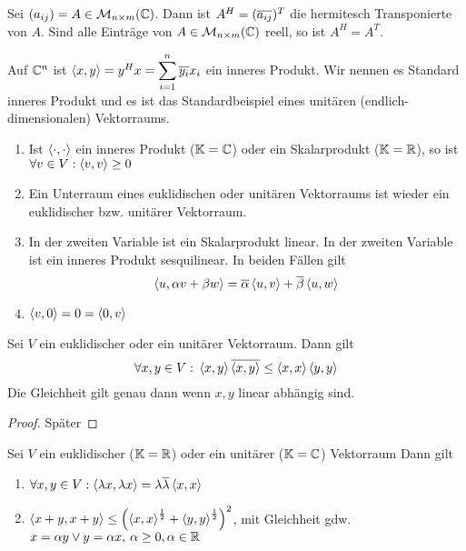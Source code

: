 \begin{definition}
    Sei $(a_{ij}) = A\in \mathcal{M}_{n\times m}(\mathbb{C})$. Dann ist $A^H = (\overline{
        a_{ij}})^T$ die hermitesch Transponierte von $A$. Sind alle Einträge von
        $A \in \mathcal{M}_{n\times m}(\mathbb{C})$ reell, so ist $A^H = A^T$.
\end{definition}
\begin{example}
    Auf $\mathbb{C}^n$ ist $\left<x,y\right>= y^H x= \displaystyle\sum_{i=1}^n \overline{y_i}x_i$ ein 
    inneres Produkt. Wir nennen es Standard inneres Produkt und es ist das 
    Standardbeispiel eines unitären (endlich-dimensionalen) Vektorraums.
\end{example}
\begin{remark}
    \hfill
    \begin{enumerate}
        \item Ist $\left<\cdot,\cdot\right>$ ein inneres Produkt ($\mathbb{K} = \mathbb{C}$) oder ein 
        Skalarprodukt ($\mathbb{K} = \mathbb{R}$), so ist $\forall v \in V: \left<v,v\right> \geq 0$ 
        \item Ein Unterraum eines euklidischen oder unitären Vektorraums ist 
        wieder ein euklidischer bzw. unitärer Vektorraum.
        \item In der zweiten Variable ist ein Skalarprodukt linear. In der 
        zweiten Variable ist ein inneres Produkt sesquilinear. In beiden Fällen
        gilt\[
            \left<u, \alpha v + \beta w\right> = \overline{\alpha}\left<u,v\right> + 
            \overline{\beta}\left<u,w\right>\]
        \item $\left<v,0\right>= 0 = \left<0,v\right>$
    \end{enumerate}
\end{remark}
\begin{theorem}
    Sei $V$ ein euklidischer oder ein unitärer Vektorraum. Dann gilt\[
        \forall x,y \in V: \hspace{.2em} \left<x,y\right>\overline{\left<x,y\right>} \leq
        \left<x,x\right>\left<y,y\right>\]
        Die Gleichheit gilt genau dann wenn $x,y$ linear abhängig sind.
\end{theorem}
\begin{proof}
    Später
\end{proof}
\begin{theorem}
    Sei $V$ ein euklidischer ($\mathbb{K} = \mathbb{R}$) oder ein unitärer ($\mathbb{K} = \mathbb{C}$) Vektorraum
    Dann gilt \begin{enumerate}
        \item $\forall x,y \in V: \left<\lambda x, \lambda x\right> = \lambda \overline{\lambda}\left<x,x\right>$
        \item $\left<x+y, x+y\right> \leq \left(\left<x,x\right>^\frac{1}{2} + \left<y,y\right>^\frac
        {1}{2}\right)^2$, mit Gleichheit gdw. $x = \alpha y \lor y = \alpha x,
        \hspace{.2em} \alpha \geq 0, \alpha \in \mathbb{R}$
    \end{enumerate}
\end{theorem}

